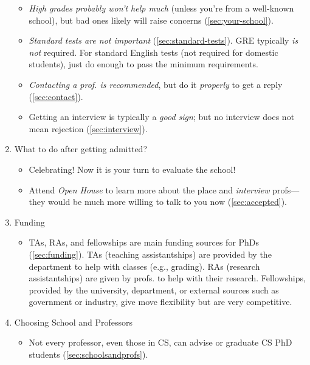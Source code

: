 \documentclass[oneside,11pt,dvipsnames]{book}
\begin{document}
\begin{enumerate}
\begin{itemize}
          \item \emph{High grades probably won't help much} (unless you're from a well-known school), but bad ones likely will raise concerns (\autoref{sec:your-school}).
          
          \item \emph{Standard tests are not important} (\autoref{sec:standard-tests}). GRE typically \emph{is not} required. For standard English tests (not required for domestic students), just do enough to pass the minimum requirements.

          \item \emph{Contacting a prof. is recommended}, but do it \emph{properly} to get a reply (\autoref{sec:contact}).

          \item Getting an interview is typically a \emph{good sign}; but no interview does not mean rejection (\autoref{sec:interview}).

        \end{itemize}
  \item What to do after getting admitted?
        \begin{itemize}
                \item  Celebrating! Now it is your turn to evaluate the school!
          \item Attend \emph{Open House} to learn more about the place and \emph{interview} profs---they would be much more willing to talk to you now (\autoref{sec:accepted}).
        \end{itemize}
  \item Funding
        \begin{itemize}
          \item TAs, RAs, and fellowships are main funding sources for PhDs (\autoref{sec:funding}).  TAs (teaching assistantships) are provided by the department to help with classes (e.g., grading). RAs (research assistantships) are given by profs. to help with their research.  Fellowships, provided by the university, department, or external sources such as government or industry, give move flexibility but are very competitive.
        \end{itemize}
  \item Choosing School and Professors
        \begin{itemize}
          \item Not every professor, even those in CS, can advise or graduate CS PhD students (\autoref{sec:schoolsandprofs}).
        \end{itemize}


\end{enumerate}
\end{document}
